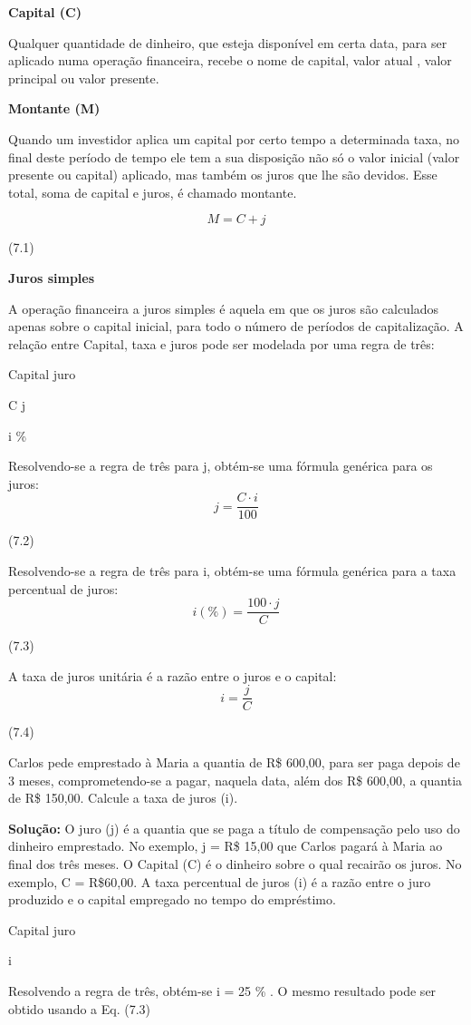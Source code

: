 \textbf{Capital (C)}

	Qualquer quantidade de dinheiro, que esteja disponível em certa data, para ser aplicado numa operação financeira, recebe o nome de capital, valor atual , valor principal ou valor presente.

\textbf{Montante (M)}

Quando um investidor aplica um capital por certo tempo a determinada taxa, no final deste período de tempo ele tem a sua disposição não só o valor inicial (valor presente ou capital) aplicado, mas também os juros que lhe são devidos. Esse total, soma de capital e juros, é chamado montante.

	$$M = C + j$$
	\begin{flushright}
		(7.1)
	\end{flushright}

	\textbf{Juros simples}
	
	A operação financeira a juros simples é aquela em que os juros são calculados apenas sobre o capital inicial, para todo o número de períodos de capitalização. A relação entre Capital, taxa e juros pode ser modelada por uma regra de três:

	\quad Capital \quad juro

	\quad C \quad \quad \quad j
	
	 \quad \quad i \%

 	Resolvendo-se a regra de três para j, obtém-se uma fórmula genérica para os juros:
	$$j=\frac{C \cdot i}{100}$$
    \begin{flushright}
		(7.2)
	\end{flushright}
	Resolvendo-se a regra de três para i, obtém-se uma fórmula genérica para a taxa percentual de juros:
	$$i(\%)=\dfrac{100 \cdot j}{C}$$
   \begin{flushright}
		(7.3)
   \end{flushright}

	A taxa de juros unitária é a razão entre o juros e o capital:
	$$i=\dfrac{j}{C}$$
  	\begin{flushright}
		(7.4)
	\end{flushright}

\begin{texemplo}
	Carlos pede emprestado à Maria a quantia de R\$ 600,00, para ser paga depois de 3 meses, comprometendo-se a pagar, naquela data, além dos R\$ 600,00, a quantia de R\$ 150,00. Calcule a taxa de juros (i).

\textbf{Solução:} O juro (j) é a quantia que se paga a título de compensação pelo uso do dinheiro emprestado. No exemplo, j = R\$ 15,00 que Carlos pagará à Maria ao final dos três meses.
	O Capital (C) é o dinheiro sobre o qual recairão os juros. No exemplo, C =  R\$60,00.
	A taxa percentual de juros (i) é a razão entre o juro produzido e o capital empregado no tempo do empréstimo. 

	\quad Capital \quad juro

	 

	\quad i

	Resolvendo a regra de três, obtém-se i = 25 \% . O mesmo resultado pode ser obtido usando a Eq. (7.3) \qedsymbol{}
\end{texemplo}

